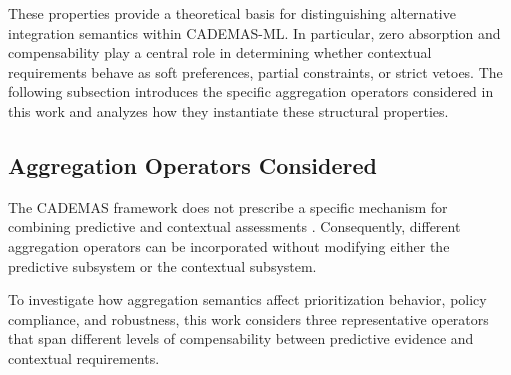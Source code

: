 \documentclass[mathematics,article,submit,moreauthors]{Definitions/mdpi}
\begin{document}
These properties provide a theoretical basis for distinguishing
alternative integration semantics within CADEMAS-ML. In particular,
zero absorption and compensability play a central role in determining
whether contextual requirements behave as soft preferences, partial
constraints, or strict vetoes. The following subsection introduces the
specific aggregation operators considered in this work and analyzes how
they instantiate these structural properties.


\subsection{Aggregation Operators Considered}
\label{subsec:aggregation-operators}
%

The CADEMAS framework does not prescribe a specific mechanism for
combining predictive and contextual assessments
\citep{NovoaHernandez2026}. Consequently, different aggregation
operators can be incorporated without modifying either the predictive
subsystem or the contextual subsystem.

To investigate how aggregation semantics affect prioritization
behavior, policy compliance, and robustness, this work considers three
representative operators that span different levels of compensability
between predictive evidence and contextual requirements.
\end{document}
